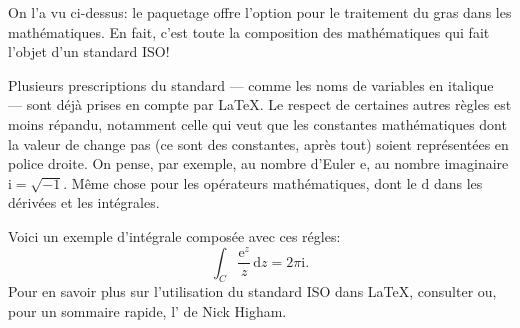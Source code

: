 \begin{information}
  On l'a vu ci-dessus: le paquetage  offre l'option
   pour le traitement du gras dans les mathématiques. En
  fait, c'est toute la composition des mathématiques qui fait l'objet
  d'un standard ISO!

  Plusieurs prescriptions du standard --- comme les noms de variables
  en italique --- sont déjà prises en compte par {\LaTeX}. Le respect
  de certaines autres règles est moins répandu, notamment celle qui
  veut que les constantes mathématiques dont la valeur de change pas
  (ce sont des constantes, après tout) soient représentées en police
  droite. On pense, par exemple, au nombre d'Euler $\mathrm{e}$, au
  nombre imaginaire $\mathrm{i} = \sqrt{-1}$. Même chose pour les
  opérateurs mathématiques, dont le $\mathrm{d}$ dans les dérivées et
  les intégrales.

  Voici un exemple d'intégrale composée avec ces régles:
  \begin{equation*}
    \int_C \frac{\mathrm{e}^z}{z}\, \mathrm{d}z = 2 \pi \mathrm{i}.
  \end{equation*}
  Pour en savoir plus sur l'utilisation du standard ISO dans {\LaTeX},
  consulter \citet{Beccari:ISO} ou, pour un sommaire rapide, l'%
  de Nick Higham.
\end{information}

